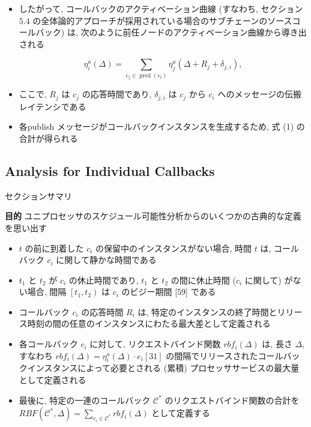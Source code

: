 \begin{frame}{}
    \begin{itemize}
        \item したがって, コールバックのアクティベーション曲線 (すなわち, セクション $5.4$ の全体論的アプローチが採用されている場合のサブチェーンのソースコールバック) は, 次のように前任ノードのアクティベーション曲線から導き出される

              \begin{equation*}
                  \eta_{i}^{a}(\Delta)=\sum_{c_{j} \in \operatorname{pred}\left(c_{i}\right)} \eta_{j}^{a}\left(\Delta+R_{j}+\delta_{j, i}\right),
              \end{equation*}

        \item ここで, $R_{j}$ は $c_{j}$ の応答時間であり, $\delta_{j, i}$ は $c_{j}$ から $c_{i}$ へのメッセージの伝搬レイテンシである
\item 各publish メッセージがコールバックインスタンスを生成するため, 式 (1) の合計が得られる
    \end{itemize}
\end{frame}


\subsection{Analysis for Individual Callbacks}
\label{ssec: analysis for individual callbacks}

\begin{frame}{セクションサマリ}
    \begin{itembox}[l]{\textbf{目的}}
        ユニプロセッサのスケジュール可能性分析からのいくつかの古典的な定義を思い出す
    \end{itembox}
\end{frame}

\begin{frame}{}
    \begin{itemize}
        \item $t$ の前に到着した $c_{i}$ の保留中のインスタンスがない場合, 時間 $t$ は, コールバック $c_{i}$ に関して静かな時間である
\item $t_{1}$ と $t_{2}$ が $c_{i}$ の休止時間であり, $t_{1}$ と $t_{2}$ の間に休止時間 ($c_{i}$ に関して) がない場合, 間隔 $\left[t_{1}, t_{2}\right)$ は $c_{i}$ のビジー期間 [59] である
\item コールバック $c_{i}$ の応答時間 $R_{i}$ は, 特定のインスタンスの終了時間とリリース時刻の間の任意のインスタンスにわたる最大差として定義される
\item 各コールバック $c_{i}$ に対して, リクエストバインド関数 $r b f_{i}(\Delta)$ は, 長さ $\Delta$, すなわち $r b f_{i}(\Delta)=\eta_{i}^{a}(\Delta) \cdot e_{i}[31]$ の間隔でリリースされたコールバックインスタンスによって必要とされる (累積) プロセッササービスの最大量として定義される
\item 最後に, 特定の一連のコールバック $\mathcal{C}^{*}$ のリクエストバインド関数の合計を $R B F\left(\mathcal{C}^{*}, \Delta\right)=\sum_{c_{i} \in \mathcal{C}^{*}} r b f_{i}(\Delta)$ として定義する
    \end{itemize}
\end{frame}

